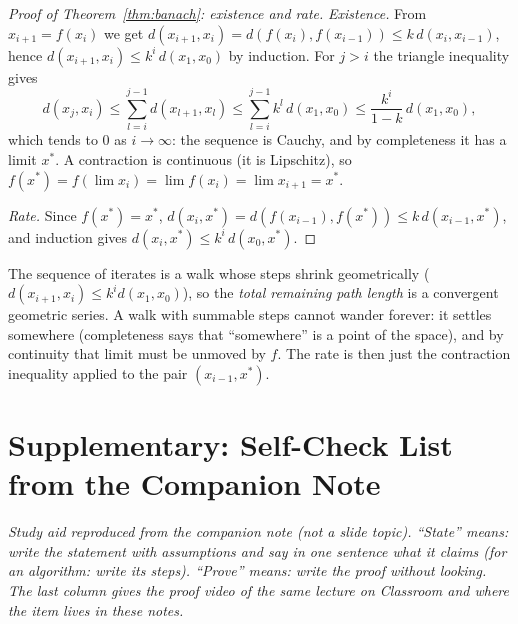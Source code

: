 \documentclass[11pt,a4paper]{article}
\theoremstyle{plain}
\theoremstyle{definition}
\theoremstyle{remark}
\begin{document}
\begin{proof}[Proof of Theorem~\ref{thm:banach}: existence and rate]
\emph{Existence.} From $x_{i+1}=f(x_i)$ we get $d(x_{i+1},x_i)=d(f(x_i),f(x_{i-1}))\le k\,d(x_i,x_{i-1})$, hence $d(x_{i+1},x_i)\le k^i\,d(x_1,x_0)$ by induction. For $j>i$ the triangle inequality gives
\[
d(x_j,x_i)\le\sum_{l=i}^{j-1}d(x_{l+1},x_l)\le\sum_{l=i}^{j-1}k^l\,d(x_1,x_0)\le\frac{k^i}{1-k}\,d(x_1,x_0),
\]
which tends to $0$ as $i\to\infty$: the sequence is Cauchy, and by completeness it has a limit $x^*$. A contraction is continuous (it is Lipschitz), so $f(x^*)=f(\lim x_i)=\lim f(x_i)=\lim x_{i+1}=x^*$.

\emph{Rate.} Since $f(x^*)=x^*$, $d(x_i,x^*)=d(f(x_{i-1}),f(x^*))\le k\,d(x_{i-1},x^*)$, and induction gives $d(x_i,x^*)\le k^i\,d(x_0,x^*)$.
\end{proof}

\begin{intuition}
The sequence of iterates is a walk whose steps shrink geometrically ($d(x_{i+1},x_i)\le k^id(x_1,x_0)$), so the \emph{total remaining path length} is a convergent geometric series. A walk with summable steps cannot wander forever: it settles somewhere (completeness says that ``somewhere'' is a point of the space), and by continuity that limit must be unmoved by $f$. The rate is then just the contraction inequality applied to the pair $(x_{i-1},x^*)$.
\end{intuition}

\section{Supplementary: Self-Check List from the Companion Note}\label{app:selfcheck}
\emph{Study aid reproduced from the companion note (not a slide topic). ``State'' means: write the statement with assumptions and say in one sentence what it claims (for an algorithm: write its steps). ``Prove'' means: write the proof without looking. The last column gives the proof video of the same lecture on Classroom and where the item lives in these notes.}
\end{document}
